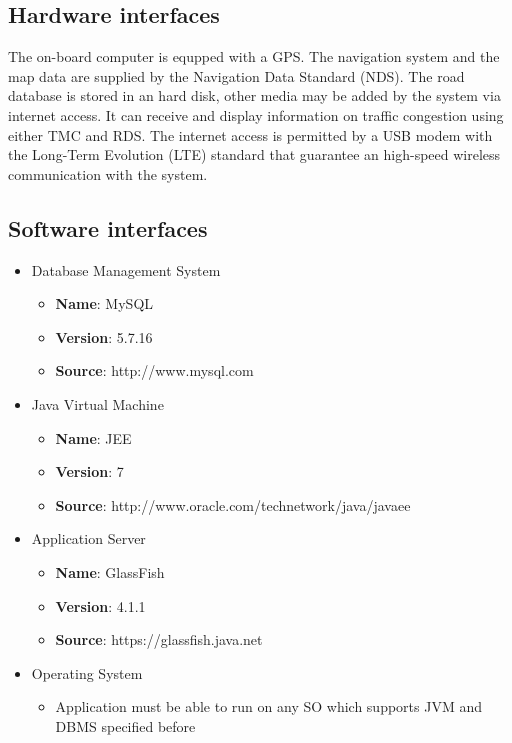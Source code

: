 \subsection{Hardware interfaces}
The on-board computer is equpped with a GPS. The  navigation system and the map data are supplied by the Navigation Data Standard (NDS). The road database is stored in an hard disk, other media may be added by the system via internet access. It can receive and display information on traffic congestion using either TMC and RDS.
The internet access is permitted by a USB modem with the Long-Term Evolution (LTE) standard that guarantee an high-speed wireless communication with the system.

\blindtext
\subsection{Software interfaces}
\begin{itemize}
	\item{Database Management System
		\begin{itemize}
			\item{{\bf Name}: MySQL}
			\item{{\bf Version}: 5.7.16}
			\item{{\bf Source}: http://www.mysql.com}
		\end{itemize}
	}
	\item{Java Virtual Machine
		\begin{itemize}
			\item{{\bf Name}: JEE}
			\item{{\bf Version}: 7}
			\item{{\bf Source}: http://www.oracle.com/technetwork/java/javaee}
		\end{itemize}
	}
	\item{Application Server
		\begin{itemize}
			\item{{\bf Name}: GlassFish}
			\item{{\bf Version}: 4.1.1}
			\item{{\bf Source}: https://glassfish.java.net}
		\end{itemize}
	}
	\item{Operating System
		\begin{itemize}
			\item{Application must be able to run on any SO which supports JVM and
				  DBMS specified before}
		\end{itemize}
	}

\end{itemize}

